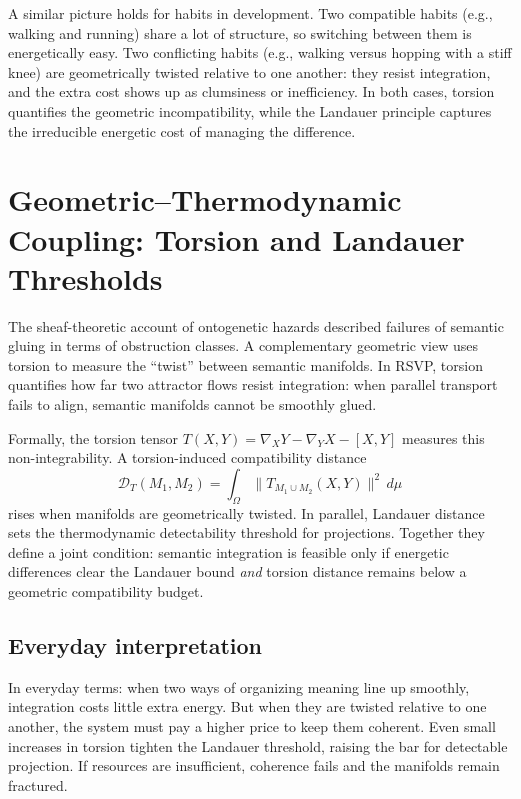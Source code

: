 \documentclass[a4paper,11pt]{article}
\begin{document}
A similar picture holds for habits in development. Two compatible habits (e.g.,
walking and running) share a lot of structure, so switching between them is
energetically easy. Two conflicting habits (e.g., walking versus hopping with a
stiff knee) are geometrically twisted relative to one another: they resist
integration, and the extra cost shows up as clumsiness or inefficiency. In both
cases, torsion quantifies the geometric incompatibility, while the Landauer
principle captures the irreducible energetic cost of managing the difference.

\section{Geometric--Thermodynamic Coupling: Torsion and Landauer Thresholds}

The sheaf-theoretic account of ontogenetic hazards described failures of
semantic gluing in terms of obstruction classes. A complementary geometric
view uses torsion to measure the ``twist'' between semantic manifolds. In RSVP,
torsion quantifies how far two attractor flows resist integration: when
parallel transport fails to align, semantic manifolds cannot be smoothly glued.

Formally, the torsion tensor $T(X,Y)=\nabla_X Y-\nabla_Y X-[X,Y]$ measures this
non-integrability. A torsion-induced compatibility distance
\[
\mathcal{D}_T(M_1,M_2)=\int_\Omega \|T_{M_1\cup M_2}(X,Y)\|^2\,d\mu
\]
rises when manifolds are geometrically twisted. In parallel, Landauer distance
sets the thermodynamic detectability threshold for projections. Together they
define a joint condition: semantic integration is feasible only if energetic
differences clear the Landauer bound \emph{and} torsion distance remains below
a geometric compatibility budget.

\subsection{Everyday interpretation}

In everyday terms: when two ways of organizing meaning line up smoothly,
integration costs little extra energy. But when they are twisted relative to
one another, the system must pay a higher price to keep them coherent. Even
small increases in torsion tighten the Landauer threshold, raising the bar for
detectable projection. If resources are insufficient, coherence fails and the
manifolds remain fractured.
\end{document}
